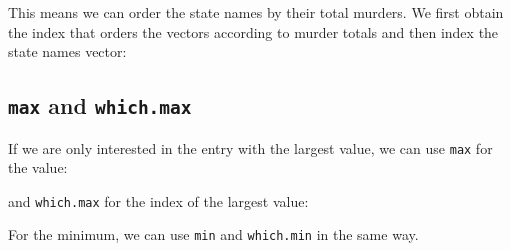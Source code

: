 \documentclass[
]{krantz}
\newenvironment{Shaded}{\begin{snugshade}}{\end{snugshade}}
\newcommand{\CommentTok}[1]{\textcolor[rgb]{0.37,0.37,0.37}{\textit{#1}}}
\newcommand{\DecValTok}[1]{\textcolor[rgb]{0.06,0.06,0.06}{#1}}
\newcommand{\KeywordTok}[1]{\textcolor[rgb]{0.27,0.27,0.27}{\textbf{#1}}}
\newcommand{\NormalTok}[1]{#1}
\newcommand{\OperatorTok}[1]{\textcolor[rgb]{0.43,0.43,0.43}{\textbf{#1}}}
\newcommand{\StringTok}[1]{\textcolor[rgb]{0.5,0.5,0.5}{#1}}
\begin{document}
This means we can order the state names by their total murders. We first obtain the index that orders the vectors according to murder totals and then index the state names vector:

\begin{Shaded}
\end{Shaded}

\hypertarget{max-and-which.max}{%
\subsection{\texorpdfstring{\texttt{max} and \texttt{which.max}}{max and which.max}}\label{max-and-which.max}}

If we are only interested in the entry with the largest value, we can use \texttt{max} for the value:

\begin{Shaded}
\end{Shaded}

and \texttt{which.max} for the index of the largest value:

\begin{Shaded}
\end{Shaded}

For the minimum, we can use \texttt{min} and \texttt{which.min} in the same way.

\begin{Shaded}
\end{Shaded}
\end{document}
